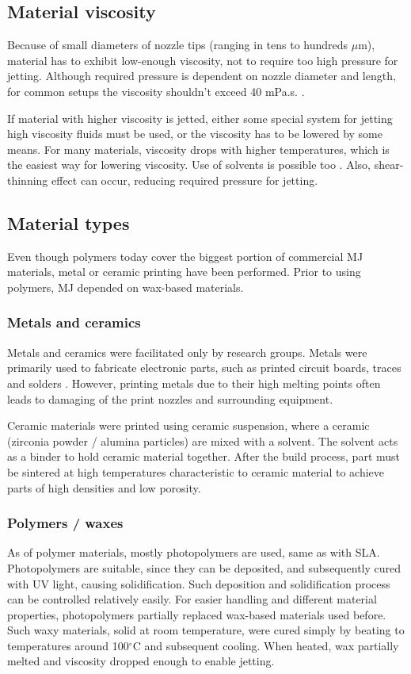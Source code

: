 \documentclass[a4paper, 11pt, reqno]{report}
\begin{document}
\subsection{Material viscosity}
Because of small diameters of nozzle tips (ranging in tens to hundreds $\mu$m), material has to exhibit low-enough viscosity, not to require too high pressure for jetting. Although required pressure is dependent on nozzle diameter and length, for common setups the viscosity shouldn't exceed 40 mPa.s. \cite[p. 176]{AMT}.

	If material with higher viscosity is jetted, either some special system for jetting high viscosity fluids must be used, or the viscosity has to be lowered by some means. For many materials, viscosity drops with higher temperatures, which is the easiest way for lowering viscosity. Use of solvents is possible too \cite{MJ}. Also, shear-thinning effect can occur, reducing required pressure for jetting.

\subsection{Material types}
	Even though polymers today cover the biggest portion of commercial MJ materials, metal or ceramic printing have been performed. Prior to using polymers, MJ depended on wax-based materials.

\subsubsection{Metals and ceramics}
	Metals and ceramics were facilitated only by research groups. Metals were primarily used to fabricate electronic parts, such as printed circuit boards, traces and solders \cite{MJmetals}. However, printing metals due to their high melting points often leads to damaging of the print nozzles and surrounding equipment.
	
	Ceramic materials were printed using ceramic suspension, where a ceramic (zirconia powder / alumina particles) are mixed with a solvent. The solvent acts as a binder to hold ceramic material together. After the build process, part must be sintered at high temperatures characteristic to ceramic material to achieve parts of high densities and low porosity.

\subsubsection{Polymers / waxes}
	As of polymer materials, mostly photopolymers are used, same as with SLA. Photopolymers are suitable, since they can be deposited, and subsequently cured with UV light, causing solidification. Such deposition and solidification process can be controlled relatively easily. For easier handling and different material properties, photopolymers partially replaced wax-based materials used before. Such waxy materials, solid at room temperature, were cured simply by beating to temperatures around 100$^{\circ}$C and subsequent cooling. When heated, wax partially melted and viscosity dropped enough to enable jetting.
	
\end{document}
